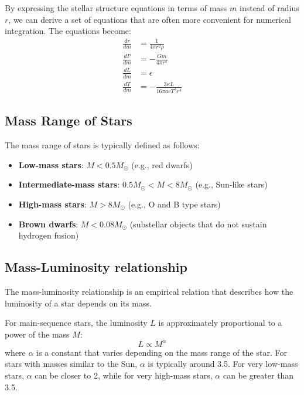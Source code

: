 \begin{theory}
By expressing the stellar structure equations in terms of mass $m$ instead of radius $r$, we can derive a set of equations that are often more convenient for numerical integration. The equations become:
\begin{align}
\frac{dr}{dm} &= \frac{1}{4\pi r^2 \rho} \\
\frac{dP}{dm} &= -\frac{G m}{4\pi r^4} \\
\frac{dL}{dm} &= \epsilon \\
\frac{dT}{dm} &= -\frac{3 \kappa L}{16\pi a c T^3 r^4}
\end{align}
\end{theory}

\subsection{Mass Range of Stars}
The mass range of stars is typically defined as follows:
\begin{itemize}
    \item \textbf{Low-mass stars}: $M < 0.5 M_\odot$ (e.g., red dwarfs)
    \item \textbf{Intermediate-mass stars}: $0.5 M_\odot < M < 8 M_\odot$ (e.g., Sun-like stars)
    \item \textbf{High-mass stars}: $M > 8 M_\odot$ (e.g., O and B type stars)  
    \item \textbf{Brown dwarfs}: $M < 0.08 M_\odot$ (substellar objects that do not sustain hydrogen fusion)
\end{itemize}

\subsection{Mass-Luminosity relationship}
The mass-luminosity relationship is an empirical relation that describes how the luminosity of a star depends on its mass. 
\begin{foundation}
For main-sequence stars, the luminosity $L$ is approximately proportional to a power of the mass $M$:
\begin{equation}
L \propto M^\alpha
\end{equation}
where $\alpha$ is a constant that varies depending on the mass range of the star. For stars with masses similar to the Sun, $\alpha$ is typically around 3.5. 
For very low-mass stars, $\alpha$ can be closer to 2, while for very high-mass stars, $\alpha$ can be greater than 3.5.
\end{foundation}



